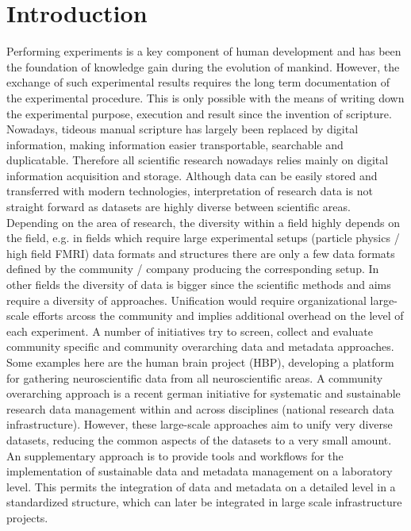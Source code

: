 \clearpage
\chapter{Introduction}
\label{sec:intro}

Performing experiments is a key component of human development and has been the foundation of knowledge gain during the evolution of mankind. However, the exchange of such experimental results requires the long term documentation of the  experimental procedure. This is only possible with the means of writing down the experimental purpose, execution and result since the invention of scripture. Nowadays, tideous manual scripture has largely been replaced by digital information, making information easier transportable, searchable and duplicatable. Therefore all scientific research nowadays relies mainly on digital information acquisition and storage. Although data can be easily stored and transferred with modern technologies, interpretation of research data is not straight forward as datasets are highly diverse between scientific areas. Depending on the area of research, the diversity within a field highly depends on the field, e.g. in fields which require large experimental setups (particle physics / high field FMRI) data formats and structures  there are only a few data formats defined by the community / company producing the corresponding setup. In other fields the diversity of data is bigger since the scientific methods and aims require a diversity of approaches. Unification would require organizational large-scale efforts arcoss the community and implies additional overhead on the level of each experiment. A number of initiatives try to screen, collect and evaluate community specific and community overarching data and metadata approaches. Some examples here are the human brain project (HBP), developing a platform for gathering neuroscientific data from all neuroscientific areas. A community overarching approach is a recent german initiative for systematic and sustainable research data management within and across disciplines (national research data infrastructure). However, these large-scale approaches aim to unify very diverse datasets, reducing the common aspects of the datasets to a very small amount. An supplementary approach is to provide tools and workflows for the implementation of sustainable data and metadata management on a laboratory level. This permits the integration of data and metadata on a detailed level in a standardized structure, which can later be integrated in large scale infrastructure projects.

